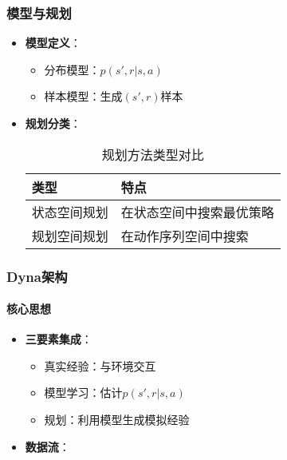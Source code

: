 \subsubsection{模型与规划}
\begin{itemize}
    \item \textbf{模型定义}：
        \begin{itemize}
            \item 分布模型：$p(s',r|s,a)$
            \item 样本模型：生成$(s',r)$样本
        \end{itemize}
    \item \textbf{规划分类}：
        \begin{table}[H]  %
            \centering
            \caption{规划方法类型对比}
            \begin{tabular}{ll}
            \toprule
            \textbf{类型} & \textbf{特点} \\
            \midrule
            状态空间规划 & 在状态空间中搜索最优策略 \\
            规划空间规划 & 在动作序列空间中搜索 \\
            \bottomrule
            \end{tabular}
        \end{table}

\end{itemize}

\subsubsection{Dyna架构}
\paragraph{核心思想}
\begin{itemize}
    \item \textbf{三要素集成}：
        \begin{itemize}
            \item 真实经验：与环境交互
            \item 模型学习：估计$p(s',r|s,a)$
            \item 规划：利用模型生成模拟经验
        \end{itemize}
    \item \textbf{数据流}：
        \begin{figure}[h]
\centering
{}
\label{fig:rl_interaction}
\end{figure}
\end{itemize}

